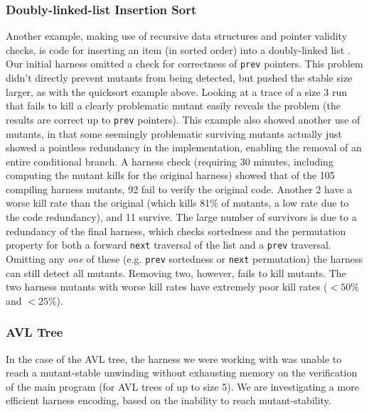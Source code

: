 \documentclass{svjour3}
\begin{document}
\subsubsection{Doubly-linked-list Insertion Sort}

Another example, making use of recursive data structures and pointer
validity checks, is code for inserting an item (in
sorted order) into a doubly-linked list \cite{DLLInsert}.  Our initial
harness omitted a check for correctness of {\tt prev} pointers.  This
problem didn't directly prevent mutants from being detected, but
pushed the stable size larger, as with the quicksort example above.
Looking at a trace of a size 3 run that fails to kill a clearly
problematic mutant easily reveals the problem (the results are correct
up to {\tt prev} pointers).  This example also showed another use of
mutants, in that some seemingly problematic surviving mutants actually
just showed a pointless redundancy in the implementation, enabling the
removal of an entire conditional branch.  A harness check (requiring
30 minutes, including computing the mutant kills for the original
harness) showed that of the 105 compiling harness mutants, 92 fail to
verify the original code.  Another 2 have a worse kill rate than the
original (which kills 81\% of mutants, a low rate due to the code
redundancy), and 11 survive.  The large number of survivors is due to
a redundancy of the final harness, which checks sortedness and the
permutation property for both a forward {\tt next} traversal of the
list and a {\tt prev} traversal.  Omitting any \emph{one} of these
(e.g. {\tt prev} sortedness or {\tt next} permutation) the harness can
still detect all mutants.  Removing two, however, fails to kill
mutants.  The two harness mutants with worse kill rates have extremely poor
kill rates ($<50$\% and $<25$\%).

\subsubsection{AVL Tree}

In the case of the AVL tree, the harness we were working with
was unable to reach a mutant-stable unwinding without exhausting
memory on the verification of the main program (for AVL trees of up to
size 5).  We are investigating a more efficient harness encoding,
based on the inability to reach mutant-stability. 
\end{document}
